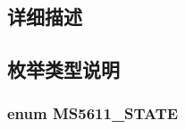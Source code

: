\subsection{详细描述}


\subsection{枚举类型说明}
\subsubsection[{\texorpdfstring{M\+S5611\+\_\+\+S\+T\+A\+TE}{MS5611_STATE}}]{\setlength{\rightskip}{0pt plus 5cm}enum {\bf M\+S5611\+\_\+\+S\+T\+A\+TE}}\hypertarget{group__ms5611__driver__internal_ga87a0c5ca64ec1e29ddc31ab17c5f5022}{}\label{group__ms5611__driver__internal_ga87a0c5ca64ec1e29ddc31ab17c5f5022}
